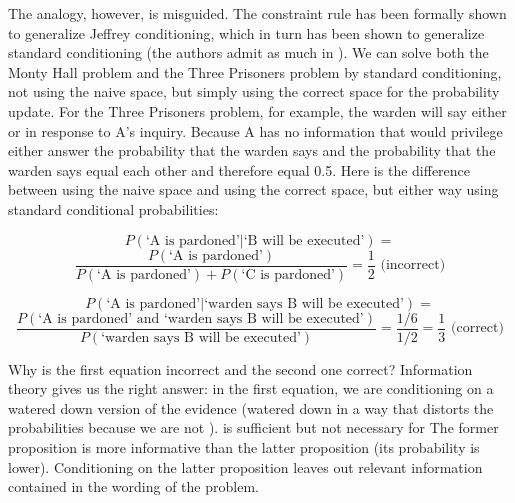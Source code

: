 \documentclass[12pt]{article}
\begin{document}
The analogy, however, is misguided. The constraint rule has been
formally shown to generalize Jeffrey conditioning, which in turn has
been shown to generalize standard conditioning (the authors admit as
much in ). We can solve both the
Monty Hall problem and the Three Prisoners problem by standard
conditioning, not using the naive space, but simply using the correct
space for the probability update. For the Three Prisoners problem, for
example, the warden will say either  or  in response
to A's inquiry. Because A has no information that would privilege
either answer the probability that the warden says  and the
probability that the warden says  equal each other and
therefore equal 0.5. Here is the difference between using the naive
space and using the correct space, but either way using standard
conditional probabilities:

\begin{displaymath}
  P(\mbox{`A is pardoned'}|\mbox{`B will be
    executed'})=
\end{displaymath}
\begin{displaymath}
  \frac{P(\mbox{`A is pardoned'})}{P(\mbox{`A is
      pardoned'})+P(\mbox{`C is pardoned'})}=\frac{1}{2}\mbox{ (incorrect)}
\end{displaymath}

\begin{displaymath}
  P(\mbox{`A is pardoned'}|\mbox{`warden says B will be
    executed'})=
\end{displaymath}
\begin{displaymath}
  \frac{P(\mbox{`A is pardoned' and `warden says B will
      be executed'})}{P(\mbox{`warden says B will be
      executed'})}=\frac{1/6}{1/2}=\frac{1}{3}\mbox{ (correct)}
\end{displaymath}

\nial Why is the first equation incorrect and the second one correct?
Information theory gives us the right answer: in the first equation,
we are conditioning on a watered down version of the evidence (watered
down in a way that distorts the probabilities because we are not
). 
is sufficient but not necessary for  The
former proposition is more informative than the latter proposition
(its probability is lower). Conditioning on the latter proposition
leaves out relevant information contained in the wording of the
problem.
\end{document}
